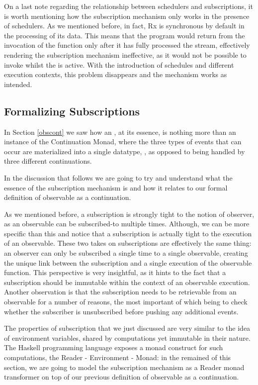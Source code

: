 On a last note regarding the relationship between schedulers and subscriptions, it is worth mentioning how the subscription mechanism only works in the presence of schedulers. As we mentioned before, in fact, Rx is synchronous by default in the processing of its data. This means that the program would return from the invocation of the  function only after it has fully processed the stream, effectively rendering the subscription mechanism ineffective, as it would not be possible to invoke  whilst the  is active. With the introduction of schedules and different execution contexts, this problem disappears and the mechanism works as intended.

\subsection{Formalizing Subscriptions}

In Section \ref{obscont} we saw how an , at its essence, is nothing more than an instance of the Continuation Monad, where the three types of events that can occur are materialized into a single datatype, , as opposed to being handled by three different continuations.

In the discussion that follows we are going to try and understand what the essence of the subscription mechanism is and how it relates to our formal definition of observable as a continuation. 

As we mentioned before, a subscription is strongly tight to the notion of observer, as an observable can be subscribed-to multiple times. Although, we can be more specific than this and notice that a subscription is actually tight to the execution of an observable. These two takes on subscriptions are effectively the same thing: an observer can only be subscribed a single time to a single observable, creating the unique link between the subscription and a single execution of the observable function. This perspective is very insightful, as it hints to the fact that a subscription should be immutable within the context of an observable execution. Another observation is that the subscription needs to be retrievable from an observable for a number of reasons, the most important of which being to check whether the subscriber is unsubscribed before pushing any additional events.

The properties of subscription that we just discussed are very similar to the idea of environment variables, shared by computations yet immutable in their nature. The Haskell programming language exposes a monad construct for such computations, the Reader - Environment - Monad: in the remained of this section, we are going to model the subscription mechanism as a Reader monad transformer on top of our previous definition of observable as a continuation.

